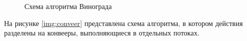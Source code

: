 \documentclass[a4paper,12pt]{article}
\begin{document}
\begin{figure}[H]
    \caption{Схема алгоритма Винограда}
    \label{img:modvinograd}
\end{figure}

На рисунке \ref{img:conveer} представлена схема алгоритма, в котором действия
разделены на конвееры, выполняющиеся в отдельных потоках.
\end{document}
